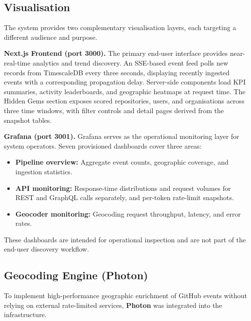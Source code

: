 \documentclass[sigconf]{acmart}
\begin{document}
\subsection{Visualisation}

The system provides two complementary visualisation layers, each targeting a different audience and purpose.

\textbf{Next.js Frontend (port 3000).}
The primary end-user interface provides near-real-time analytics and trend discovery. An SSE-based event feed polls new records from TimescaleDB every three seconds, displaying recently ingested events with a corresponding propagation delay. Server-side components load KPI summaries, activity leaderboards, and geographic heatmaps at request time. The Hidden Gems section exposes scored repositories, users, and organisations across three time windows, with filter controls and detail pages derived from the snapshot tables.

\textbf{Grafana (port 3001).}
Grafana serves as the operational monitoring layer for system operators. Seven provisioned dashboards cover three areas:
\begin{itemize}
    \item \textbf{Pipeline overview:} Aggregate event counts, geographic coverage, and ingestion statistics.
    \item \textbf{API monitoring:} Response-time distributions and request volumes for REST and GraphQL calls separately, and per-token rate-limit snapshots.
    \item \textbf{Geocoder monitoring:} Geocoding request throughput, latency, and error rates.
\end{itemize}
These dashboards are intended for operational inspection and are not part of the end-user discovery workflow.

\subsection{Geocoding Engine (Photon)}
\label{sec:geocoder}
To implement high-performance geographic enrichment of GitHub events without relying on external rate-limited services, \textbf{Photon} was integrated into the infrastructure.
\end{document}
